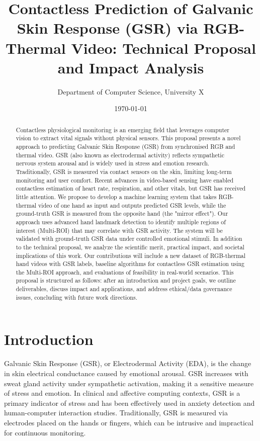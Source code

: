 \documentclass[12pt]{article}
\title{\textbf{Contactless Prediction of Galvanic Skin Response (GSR) via RGB-Thermal Video: Technical Proposal and Impact Analysis}}
\author{Department of Computer Science, University X}
\date{\today}
\begin{document}
    \maketitle

    \begin{abstract}
        Contactless physiological monitoring is an emerging field that leverages computer vision to extract vital signals without physical sensors. This proposal presents a novel approach to predicting Galvanic Skin Response (GSR) from synchronised RGB and thermal video. GSR (also known as electrodermal activity) reflects sympathetic nervous system arousal and is widely used in stress and emotion research. Traditionally, GSR is measured via contact sensors on the skin, limiting long-term monitoring and user comfort. Recent advances in video-based sensing have enabled contactless estimation of heart rate, respiration, and other vitals, but GSR has received little attention. We propose to develop a machine learning system that takes RGB-thermal video of one hand as input and outputs predicted GSR levels, while the ground-truth GSR is measured from the opposite hand (the "mirror effect"). Our approach uses advanced hand landmark detection to identify multiple regions of interest (Multi-ROI) that may correlate with GSR activity. The system will be validated with ground-truth GSR data under controlled emotional stimuli. In addition to the technical proposal, we analyze the scientific merit, practical impact, and societal implications of this work. Our contributions will include a new dataset of RGB-thermal hand videos with GSR labels, baseline algorithms for contactless GSR estimation using the Multi-ROI approach, and evaluations of feasibility in real-world scenarios. This proposal is structured as follows: after an introduction and project goals, we outline deliverables, discuss impact and applications, and address ethical/data governance issues, concluding with future work directions.
    \end{abstract}

    \tableofcontents


    \section{Introduction}
    Galvanic Skin Response (GSR), or Electrodermal Activity (EDA), is the change in skin electrical conductance caused by emotional arousal. GSR increases with sweat gland activity under sympathetic activation, making it a sensitive measure of stress and emotion. In clinical and affective computing contexts, GSR is a primary indicator of stress and has been effectively used in anxiety detection and human-computer interaction studies. Traditionally, GSR is measured via electrodes placed on the hands or fingers, which can be intrusive and impractical for continuous monitoring.
\end{document}
